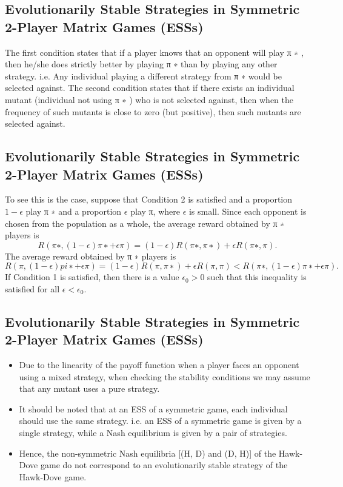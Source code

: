\documentclass[]{report}
\begin{document}
	
	\subsection{Evolutionarily Stable Strategies in Symmetric 2-Player
		Matrix Games (ESSs)}
	The first condition states that if a player knows that an opponent
	will play π
	∗
	, then he/she does strictly better by playing π
	∗
	than by
	playing any other strategy.
	i.e. Any individual playing a different strategy from π
	∗ would be
	selected against.
	The second condition states that if there exists an individual
	mutant (individual not using π
	∗
	) who is not selected against, then
	when the frequency of such mutants is close to zero (but positive),
	then such mutants are selected against.
	\subsection{Evolutionarily Stable Strategies in Symmetric 2-Player
		Matrix Games (ESSs)}
	To see this is the case, suppose that Condition 2 is satisfied and a
	proportion $1 − \epsilon$ play π
	∗
	and a proportion $\epsilon$ play π, where $\epsilon$ is small.
	Since each opponent is chosen from the population as a whole, the
	average reward obtained by π
	∗ players is
\[	R(π
	∗
	,(1 − \epsilon)π
	∗ + \epsilon π) = (1 − \epsilon)R(π
	∗
	, π∗
	) + \epsilon R(π
	∗
	, π).\]
	The average reward obtained by π
	∗ players is
\[	R(\pi,(1−\epsilon)pi
	∗+\epsilon \pi) = (1−\epsilon)R(π, π∗
	)+\epsilon R(π, π) < R(π
	∗
	,(1−\epsilon)\pi
	∗+\epsilon \pi).\]
	If Condition 1 is satisfied, then there is a value $\epsilon_0 > 0$ such that
	this inequality is satisfied for all $\epsilon < \epsilon_0$.
	
	\subsection{Evolutionarily Stable Strategies in Symmetric 2-Player
		Matrix Games (ESSs)}
\begin{itemize}
	\item 	Due to the linearity of the payoff function when a player faces an
	opponent using a mixed strategy, when checking the stability
	conditions we may assume that any mutant uses a pure strategy.
	\item 	It should be noted that at an ESS of a symmetric game, each
	individual should use the same strategy.
	i.e. an ESS of a symmetric game is given by a single strategy,
	while a Nash equilibrium is given by a pair of strategies.
	\item 	Hence, the non-symmetric Nash equilibria [(H, D) and (D, H)] of
	the Hawk-Dove game do not correspond to an evolutionarily stable
	strategy of the Hawk-Dove game.
\end{itemize}
\end{document}
